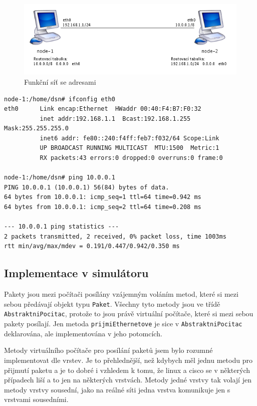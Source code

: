 \begin{figure}[h]
\begin{center}
\includegraphics[width=12cm]{obrazky/divna_sit}
\caption{Funkční síť se  adresami}
\label{obr_divna_sit}
\end{center}
\end{figure}

\begin{verbatim}
node-1:/home/dsn# ifconfig eth0
eth0      Link encap:Ethernet  HWaddr 00:40:F4:B7:F0:32
          inet addr:192.168.1.1  Bcast:192.168.1.255  Mask:255.255.255.0
          inet6 addr: fe80::240:f4ff:feb7:f032/64 Scope:Link
          UP BROADCAST RUNNING MULTICAST  MTU:1500  Metric:1
          RX packets:43 errors:0 dropped:0 overruns:0 frame:0

node-1:/home/dsn# ping 10.0.0.1
PING 10.0.0.1 (10.0.0.1) 56(84) bytes of data.
64 bytes from 10.0.0.1: icmp_seq=1 ttl=64 time=0.942 ms
64 bytes from 10.0.0.1: icmp_seq=2 ttl=64 time=0.208 ms

--- 10.0.0.1 ping statistics ---
2 packets transmitted, 2 received, 0% packet loss, time 1003ms
rtt min/avg/max/mdev = 0.191/0.447/0.942/0.350 ms

\end{verbatim}


\subsection{Implementace v simulátoru}

Pakety jsou mezi počítači posílány vzájemným voláním metod, které si mezi sebou předávají objekt typu \verb|Paket|. Všechny tyto metody jsou ve třídě \verb|AbstraktniPocitac|, protože to jsou právě virtuální počítače, které si mezi sebou pakety posílají. Jen metoda \verb|prijmiEthernetove| je sice v \verb|AbstraktniPocitac| deklarována, ale implementována v jeho potomcích.


Metody virtuálního počítače pro posílání paketů jsem bylo rozumné implementovat dle vrstev. Je to přehlednější, než kdybych měl jednu metodu pro přijmutí paketu a je to dobré i vzhledem k tomu, že linux a cisco se v některých případech liší a to jen na některých vrstvách. Metody jedné vrstvy tak volají jen metody vrstvy sousední, jako na reálné síti jedna vrstva komunikuje jen s vrstvami sousedními.

